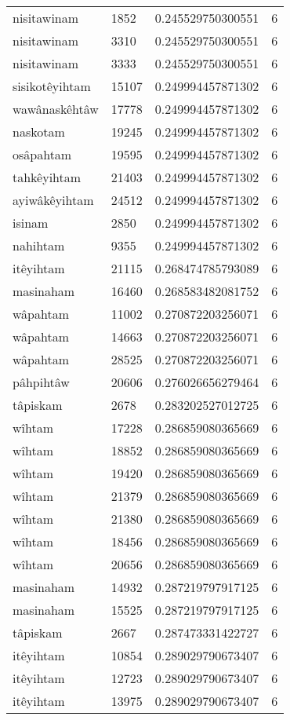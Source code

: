 \begin{longtable}{llll}
nisitawinam & 1852 & 0.245529750300551 & 6 \\
nisitawinam & 3310 & 0.245529750300551 & 6 \\
nisitawinam & 3333 & 0.245529750300551 & 6 \\
sisikotêyihtam & 15107 & 0.249994457871302 & 6 \\
wawânaskêhtâw & 17778 & 0.249994457871302 & 6 \\
naskotam & 19245 & 0.249994457871302 & 6 \\
osâpahtam & 19595 & 0.249994457871302 & 6 \\
tahkêyihtam & 21403 & 0.249994457871302 & 6 \\
ayiwâkêyihtam & 24512 & 0.249994457871302 & 6 \\
isinam & 2850 & 0.249994457871302 & 6 \\
nahihtam & 9355 & 0.249994457871302 & 6 \\
itêyihtam & 21115 & 0.268474785793089 & 6 \\
masinaham & 16460 & 0.268583482081752 & 6 \\
wâpahtam & 11002 & 0.270872203256071 & 6 \\
wâpahtam & 14663 & 0.270872203256071 & 6 \\
wâpahtam & 28525 & 0.270872203256071 & 6 \\
pâhpihtâw & 20606 & 0.276026656279464 & 6 \\
tâpiskam & 2678 & 0.283202527012725 & 6 \\
wîhtam & 17228 & 0.286859080365669 & 6 \\
wîhtam & 18852 & 0.286859080365669 & 6 \\
wîhtam & 19420 & 0.286859080365669 & 6 \\
wîhtam & 21379 & 0.286859080365669 & 6 \\
wîhtam & 21380 & 0.286859080365669 & 6 \\
wîhtam & 18456 & 0.286859080365669 & 6 \\
wîhtam & 20656 & 0.286859080365669 & 6 \\
masinaham & 14932 & 0.287219797917125 & 6 \\
masinaham & 15525 & 0.287219797917125 & 6 \\
tâpiskam & 2667 & 0.287473331422727 & 6 \\
itêyihtam & 10854 & 0.289029790673407 & 6 \\
itêyihtam & 12723 & 0.289029790673407 & 6 \\
itêyihtam & 13975 & 0.289029790673407 & 6 \\

\end{longtable}
